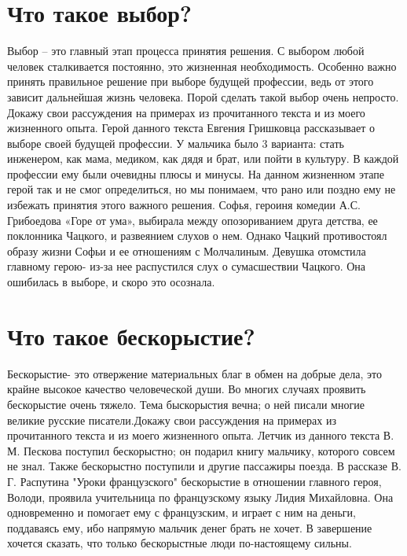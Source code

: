 \documentclass[12pt, letterpaper]{article}
\begin{document}
\section{Что такое выбор?}
Выбор – это главный этап процесса принятия решения. С выбором любой человек сталкивается постоянно, это жизненная необходимость. Особенно важно принять правильное решение при выборе будущей профессии, ведь от этого зависит дальнейшая жизнь человека. Порой сделать такой выбор очень непросто. Докажу свои рассуждения на примерах из прочитанного текста и из моего жизненного опыта.
Герой данного текста Евгения Гришковца рассказывает о выборе своей будущей профессии. У мальчика было 3 варианта: стать инженером, как мама, медиком, как дядя и брат, или пойти в культуру. В каждой профессии ему были очевидны плюсы и минусы. На данном жизненном этапе герой так и не смог определиться, но мы понимаем, что рано или поздно ему не избежать принятия этого важного решения. 
Софья, героиня комедии А.С. Грибоедова «Горе от ума», выбирала между опозориванием друга детства, ее поклонника Чацкого, и развеянием слухов о нем. Однако Чацкий противостоял образу жизни Софьи и ее отношениям с Молчалиным. Девушка отомстила главному герою- из-за нее распустился слух о сумасшествии Чацкого. Она ошибилась в выборе, и скоро это осознала.

\section{Что такое бескорыстие?}
Бескорыстие- это отвержение материальных благ в обмен на добрые дела, это крайне высокое качество человеческой души. Во многих случаях проявить бескорыстие очень тяжело. Тема быскорыстия вечна; о ней писали многие великие русские писатели.Докажу свои рассуждения на примерах из прочитанного текста и из моего жизненного опыта.
Летчик из данного текста В. М. Пескова поступил бескорыстно; он подарил книгу мальчику, которого совсем не знал. Также бескорыстно поступили и другие пассажиры поезда.
В рассказе В. Г. Распутина "Уроки французского" бескорыстие в отношении главного героя, Володи, проявила учительница по французскому языку Лидия Михайловна. Она одновременно и помогает ему с французским, и играет с ним на деньги, поддаваясь ему, ибо напрямую мальчик денег брать не хочет.
В завершение хочется сказать, что только бескорыстные люди по-настоящему сильны.
\end{document}
